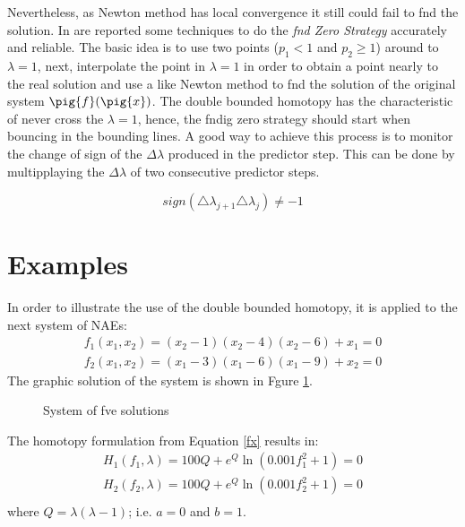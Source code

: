 \documentclass[conference]{IEEEtran}
\begin{document}
Nevertheless, as Newton method has local convergence it still could fail
to fnd the solution. In \cite{homo_sosonkina} are reported some techniques to do the {\it fnd Zero Strategy} accurately and
reliable.  The basic idea is
to use two points ($p_1 < 1$ and $p_2 \geq 1$) around to $\lambda=1$, next, interpolate the point in $\lambda=1$ in order to
obtain a point nearly to the real solution and use a like Newton method to fnd the solution
of the original system $\pig{f}(\pig{x})$.
The double bounded homotopy has the characteristic of never cross the $\lambda=1$, hence, the fndig zero strategy
should start when  bouncing in the bounding lines. A good way to achieve this process is to monitor the
change of sign of the  $\Delta\lambda$ produced in the predictor step. This can be done by multipplaying
the  $\Delta\lambda$ of two consecutive predictor steps.

\begin{displaymath}
sign(\triangle \lambda_{j+1}  \triangle \lambda_j) \ne -1 
\label{zero1}
\end{displaymath}



\section{Examples}


In order to illustrate the use of the double bounded homotopy, it is  applied to the next system of NAEs:
\begin{displaymath}
\begin{array}{c}
f_1(x_1,x_2)=(x_2-1)(x_2-4)(x_2-6)+x_1=0\\
f_2(x_1,x_2)=(x_1-3)(x_1-6)(x_1-9)+x_2=0
\end{array}
\end{displaymath}
The graphic solution of the system is shown in Fgure \ref{9sol}.

\begin{figure}[hbtp]
\centerline{
\epsfxsize=90mm
}
\caption{System of fve solutions}
\label{9sol}
\end{figure}

The homotopy formulation from Equation \ref{fx} results in:
\begin{displaymath}
\begin{array}{c}
H_1(f_1,\lambda)=100Q+e^{Q}\ln(0.001f_1^2+1)=0\\
H_2(f_2,\lambda)=100Q+e^{Q}\ln(0.001f_2^2+1)=0\\
\end{array}
\end{displaymath}
where $Q=\lambda(\lambda-1)$; i.e. $a=0$ and $b=1$.
\end{document}
